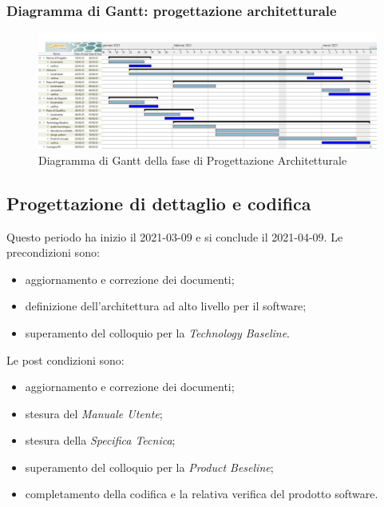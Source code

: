\subsubsection{Diagramma di Gantt: progettazione architetturale}
\begin{figure}[H]
    \centering
    \includegraphics[scale = 0.25]{components/img/progettazione_architetturale.jpg}
    \caption{Diagramma di Gantt della fase di Progettazione Architetturale}
    \label{fig:Diagramma di Gantt, fase di Progettazione Architetturale}
\end{figure}

\newpage
\subsection{Progettazione di dettaglio e codifica}
Questo periodo ha inizio il 2021-03-09 e si conclude il 2021-04-09.
Le precondizioni sono:
\begin{itemize}
	\item aggiornamento e correzione dei documenti;
	\item definizione dell'architettura ad alto livello per il software;
	\item  superamento del colloquio per la \textit{Technology Baseline}.
\end{itemize}
Le post condizioni sono:
\begin{itemize}
	\item aggiornamento e correzione dei documenti;
	\item stesura del \textit{Manuale Utente};
	\item stesura della \textit{Specifica Tecnica};
	\item superamento del colloquio per la \textit{Product Beseline};
	\item completamento della codifica e la relativa verifica del prodotto software.
\end{itemize}
